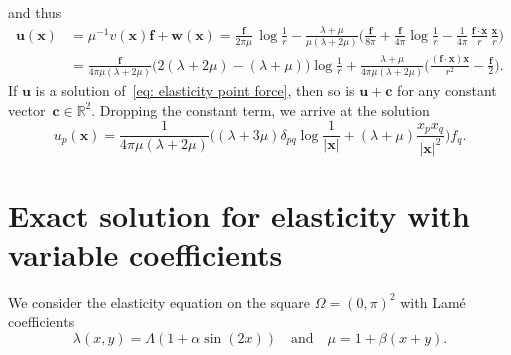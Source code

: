 \documentclass[a4paper,12pt]{article}
\newcommand{\bs}[1]{\boldsymbol{#1}}
\begin{document}
and thus
\begin{align*}
\bs{u}(\bs{x})&=\mu^{-1}v(\bs{x})\bs{f}+\bs{w}(\bs{x})
    =\frac{\bs{f}}{2\pi\mu}\,\log\frac{1}{r}
    -\frac{\lambda+\mu}{\mu(\lambda+2\mu)}\biggl(
    \frac{\bs{f}}{8\pi}+\frac{\bs{f}}{4\pi}\log\frac{1}{r}
    -\frac{1}{4\pi}\,\frac{\bs{f}\cdot\bs{x}}{r}\,\frac{\bs{x}}{r}\biggr)\\
    &=\frac{\bs{f}}{4\pi\mu(\lambda+2\mu)}\bigr(
    2(\lambda+2\mu)-(\lambda+\mu)\bigr)\log\frac{1}{r}
        +\frac{\lambda+\mu}{4\pi\mu(\lambda+2\mu)}\biggl(
    \frac{(\bs{f}\cdot\bs{x})\bs{x}}{r^2}-\frac{\bs{f}}{2}\biggr).
\end{align*}
If $\bs{u}$ is a solution of~\eqref{eq: elasticity point force}, then so is
$\bs{u}+\bs{c}$ for any constant vector~$\bs{c}\in\mathbb{R}^2$. Dropping the
constant term, we arrive at the solution
\[
u_p(\bs{x})=\frac{1}{4\pi\mu(\lambda+2\mu)}\biggl(
    (\lambda+3\mu)\delta_{pq}\log\frac{1}{|\bs{x}|}
    +(\lambda+\mu)\frac{x_px_q}{|\bs{x}|^2}\biggr)f_q.
\]
\section{Exact solution for elasticity with variable coefficients}

We consider the elasticity equation on the square $\Omega=(0,\pi)^2$ with
Lam\'e coefficients
\[
\lambda(x,y)=\Lambda(1+\alpha\sin(2x))\quad\text{and}\quad\mu=1+\beta(x+y).
\]
\end{document}
